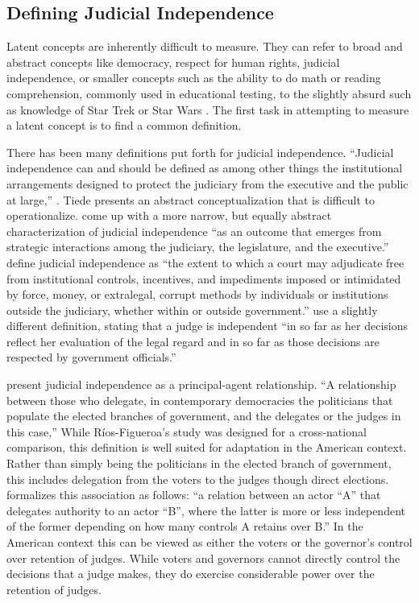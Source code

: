 \documentclass[12pt]{article}
\begin{document}
\subsection*{Defining Judicial Independence}%
Latent concepts are inherently difficult to measure.  They can refer to broad and abstract concepts like democracy, respect for human rights, judicial independence, or smaller concepts such as the ability to do math or reading comprehension, commonly used in educational testing, to the slightly absurd such as knowledge of Star Trek or Star Wars \citep{Jackman2008, Treier2008,Schnakenberg2014,Linzer2014}.  The first task in attempting to measure a latent concept is to find a common definition.  

There has been many definitions put forth for judicial independence.  ``Judicial independence can and should be defined as among other things the institutional arrangements designed to protect the judiciary from the executive and the public at large,'' \citep[131]{Tiede2006}.  Tiede presents an abstract conceptualization that is difficult to operationalize.   \citet[108]{McNollgast2006} come up with a more narrow, but equally abstract characterization of  judicial independence ``as an outcome that emerges from strategic interactions among the judiciary, the legislature, and the executive.''  \citet[286]{Howard2004} define judicial independence as ``the extent to which a court may adjudicate free from institutional controls, incentives, and impediments imposed or intimidated by force, money, or extralegal, corrupt methods by individuals or institutions outside the judiciary, whether within or outside government.''  \citet[4]{Linzer2014} use a slightly different definition, stating that a judge is independent ``in so far as her decisions reflect her evaluation of the legal regard and in so far as those decisions are respected by government officials.''

\citet{Rios2006} present judicial independence as a principal-agent relationship.  ``A relationship between those who delegate, in contemporary democracies the politicians that populate the elected branches of government, and the delegates or the judges in this case,'' \citep[6
]{Rios2006}   While R\'{i}os-Figueroa's study was designed for a cross-national comparison, this definition is well suited for adaptation in the American context.  Rather than simply being the politicians in the elected branch of government, this includes delegation from the voters to the judges though direct elections.  \citet[17]{Rios2006} formalizes this association as follows: ``a relation between an actor ``A'' that delegates authority to an actor ``B'', where the latter is more or less independent of the former depending on how many controls A retains over B.''  In the American context this can be viewed as either the voters or the governor's control over retention of judges.  While voters and governors cannot directly control the decisions that a judge makes, they do exercise considerable power over the retention of judges.  
\end{document}
